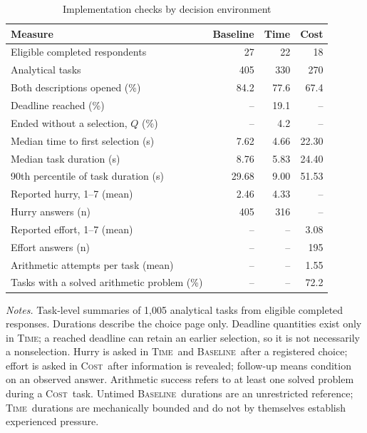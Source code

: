 \documentclass[11pt]{article}\usepackage[]{graphicx}\usepackage[]{xcolor}
\newcommand{\armT}{\textsc{Time}}
\newcommand{\armC}{\textsc{Cost}}
\newcommand{\armB}{\textsc{Baseline}}
\newenvironment{notes}{\par\smallskip\begin{minipage}{\linewidth}\footnotesize\textit{Notes.}}{\end{minipage}}
\begin{document}
\begin{table}[!htbp]
\centering\small
\caption{Implementation checks by decision environment}
\label{tab:implementation}
\begin{tabular}{@{}lrrr@{}}
\toprule
Measure & Baseline & Time & Cost \\
\midrule
Eligible completed respondents & 27 & 22 & 18 \\
Analytical tasks & 405 & 330 & 270 \\
Both descriptions opened (\%) & 84.2 & 77.6 & 67.4 \\
Deadline reached (\%) & -- & 19.1 & -- \\
Ended without a selection, $Q$ (\%) & -- & 4.2 & -- \\
Median time to first selection (s) & 7.62 & 4.66 & 22.30 \\
Median task duration (s) & 8.76 & 5.83 & 24.40 \\
90th percentile of task duration (s) & 29.68 & 9.00 & 51.53 \\
Reported hurry, 1--7 (mean) & 2.46 & 4.33 & -- \\
\quad Hurry answers (n) & 405 & 316 & -- \\
Reported effort, 1--7 (mean) & -- & -- & 3.08 \\
\quad Effort answers (n) & -- & -- & 195 \\
Arithmetic attempts per task (mean) & -- & -- & 1.55 \\
Tasks with a solved arithmetic problem (\%) & -- & -- & 72.2 \\
\bottomrule
\end{tabular}

\begin{notes}
Task-level summaries of 1,005 analytical tasks from eligible completed responses. Durations describe the choice page only. Deadline quantities exist only in \armT; a reached deadline can retain an earlier selection, so it is not necessarily a nonselection. Hurry is asked in \armT\ and \armB\ after a registered choice; effort is asked in \armC\ after information is revealed; follow-up means condition on an observed answer. Arithmetic success refers to at least one solved problem during a \armC\ task. Untimed \armB\ durations are an unrestricted reference; \armT\ durations are mechanically bounded and do not by themselves establish experienced pressure.
\end{notes}
\end{table}

\clearpage
\renewcommand{\thetable}{B\arabic{table}}
\renewcommand{\thefigure}{B\arabic{figure}}
\setcounter{table}{0}
\setcounter{figure}{0}
\end{document}
